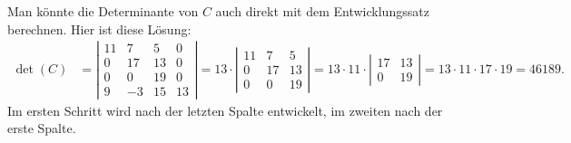 \begin{diskussion}
Man könnte die Determinante von $C$ auch direkt mit dem Entwicklungssatz
berechnen.
Hier ist diese Lösung:
\begin{align*}
\det(C)
&=
\left|\begin{matrix}
  11&   7&   5&   0\\
   0&  17&  13&   0\\
   0&   0&  19&   0\\
   9&  -3&  15&  13
\end{matrix}\right|
=
13\cdot
\left|\begin{matrix}
  11&   7&   5\\
   0&  17&  13\\
   0&   0&  19
\end{matrix}\right|
=
13\cdot 11\cdot
\left|\begin{matrix}
17&  13\\
 0&  19
\end{matrix}\right|
=
13\cdot 11\cdot 17\cdot 19
=
46189.
\end{align*}
Im ersten Schritt wird nach der letzten Spalte entwickelt, im zweiten
nach der erste Spalte.
\end{diskussion}

